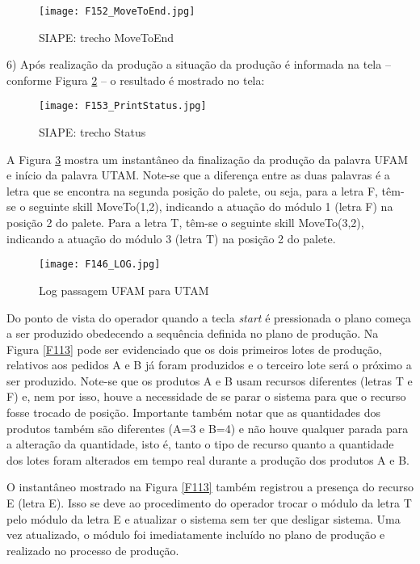 		\begin{figure}[!h]
			\centering
			\texttt{[image: F152\_MoveToEnd.jpg]} 
			\caption{SIAPE: trecho MoveToEnd}
			\label{F152}
		\end{figure}
	
	6) Após realização da produção a situação da produção é informada na tela -- conforme Figura \ref{F153} -- o resultado é mostrado no tela:
			
			\begin{figure}[!h]
				\centering
				\texttt{[image: F153\_PrintStatus.jpg]} 
				\caption{SIAPE: trecho Status}
				\label{F153}
			\end{figure}
	
	A Figura \ref{F146} mostra um instantâneo da finalização da produção da palavra UFAM e início da palavra UTAM. Note-se que a diferença entre as duas palavras é a letra que se encontra na segunda posição do palete, ou seja, para a letra F, têm-se o seguinte skill MoveTo(1,2), indicando a atuação do módulo 1 (letra F) na posição 2 do palete. Para a letra T, têm-se o seguinte skill MoveTo(3,2), indicando a atuação do módulo 3 (letra T) na posição 2 do palete.

	\begin{figure}[!h]
		\centering
		\texttt{[image: F146\_LOG.jpg]} 
		\caption{Log passagem UFAM para UTAM}
		\label{F146}
	\end{figure}


	Do ponto de vista do operador quando a tecla \textit{start} é pressionada o plano começa a ser produzido obedecendo a sequência definida no plano de produção. Na Figura \ref{F113} pode ser evidenciado que os dois primeiros lotes de produção, relativos aos pedidos A e B já foram produzidos e o terceiro lote será o próximo a ser produzido. Note-se que os produtos A e B usam recursos diferentes (letras T e F) e, nem por isso, houve a necessidade de se parar o sistema para que o recurso fosse trocado de posição. Importante também notar que as quantidades dos produtos também são diferentes (A=3 e B=4) e não houve qualquer parada para a alteração da quantidade, isto é, tanto o tipo de recurso quanto a quantidade dos lotes foram alterados em tempo real durante a produção dos produtos A e B.\par 
	O instantâneo mostrado na Figura \ref{F113} também registrou a presença do recurso E (letra E). Isso se deve ao procedimento do operador trocar o módulo da letra T pelo módulo da letra E e atualizar o sistema sem ter que desligar  sistema. Uma vez atualizado, o módulo foi imediatamente incluído no plano de produção e realizado no processo de produção.  
	
